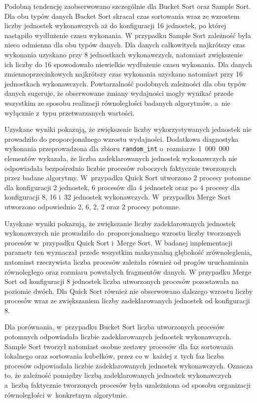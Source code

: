Podobną tendencję zaobserwowano szczególnie dla Bucket Sort oraz Sample Sort.
Dla obu typów danych Bucket Sort skracał czas sortowania wraz ze wzrostem liczby 
jednostek wykonawczych aż do konfiguracji 16 jednostek, po której nastąpiło wydłużenie czasu wykonania.
W przypadku Sample Sort zależność była nieco odmienna dla obu typów danych. 
Dla danych całkowitych najkrótszy czas wykonania uzyskano przy 8 jednostkach wykonawczych, 
natomiast zwiększenie ich liczby do 16 spowodowało niewielkie wydłużenie czasu wykonania. 
Dla danych zmiennoprzecinkowych najkrótszy czas wykonania uzyskano natomiast przy 16 jednostkach wykonawczych.
Powtarzalność podobnych zależności dla obu typów danych sugeruje, że obserwowane zmiany wydajności 
mogły wynikać przede wszystkim ze sposobu realizacji równoległości badanych algorytmów, a~nie wyłącznie z~typu przetwarzanych wartości.

Uzyskane wyniki pokazują, że zwiększenie liczby wykorzystywanych jednostek nie prowadziło do proporcjonalnego wzrostu wydajności.
Dodatkowa diagnostyka wykonania przeprowadzona dla zbioru \texttt{random\_int} o~rozmiarze 1~000~000 elementów wykazała, 
że liczba zadeklarowanych jednostek wykonawczych nie odpowiadała bezpośrednio liczbie 
procesów roboczych faktycznie tworzonych przez badane algorytmy. 
W~przypadku Quick Sort utworzono 2 procesy potomne dla konfiguracji 2 jednostek,
6 procesów dla 4 jednostek oraz po 4 procesy dla konfiguracji 8, 16 i~32 jednostek wykonawczych. 
W~przypadku Merge Sort utworzono odpowiednio 2, 6, 2, 2 oraz 2 procesy potomne.

Uzyskane wyniki pokazują, że zwiększanie liczby zadeklarowanych jednostek wykonawczych nie prowadziło 
do~proporcjonalnego wzrostu liczby tworzonych procesów w~przypadku Quick Sort i~Merge Sort.
W badanej implementacji parametr ten wyznaczał przede wszystkim maksymalną głębokość zrównoleglenia, 
natomiast rzeczywista liczba procesów zależała również od progów uruchamiania równoległego oraz rozmiaru powstałych fragmentów danych. 
W przypadku Merge Sort od konfiguracji 8 jednostek liczba utworzonych procesów pozostawała na poziomie dwóch. 
Dla Quick Sort również nie obserwowano dalszego wzrostu liczby procesów wraz ze zwiększaniem liczby zadeklarowanych jednostek od konfiguracji 8.

Dla porównania, w~przypadku Bucket Sort liczba utworzonych procesów potomnych odpowiadała liczbie zadeklarowanych jednostek wykonawczych. 
Sample Sort tworzył natomiast osobne zestawy procesów dla faz sortowania lokalnego oraz sortowania kubełków, 
przez co w~każdej z~tych faz liczba procesów odpowiadała liczbie zadeklarowanych jednostek wykonawczych. 
Oznacza to, że zależność pomiędzy liczbą zadeklarowanych jednostek wykonawczych a~liczbą faktycznie
tworzonych procesów była uzależniona od sposobu organizacji równoległości w~konkretnym algorytmie.

